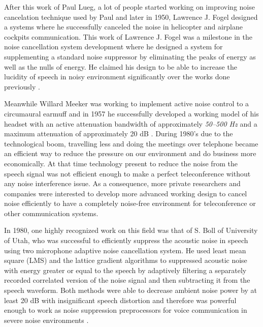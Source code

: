 \documentclass[11pt,a4paper,english]{book}  %
\theoremstyle{definition}  %
\theoremstyle{plain}  %
\theoremstyle{remark}  %
\begin{document}
After this work of Paul Lueg, a lot of people started working on improving noise cancelation technique used by Paul and later in 1950, Lawrence J. Fogel designed a systems where he successfully canceled the noise in helicopter and airplane cockpits communication. This work of Lawrence J. Fogel was a milestone in the noise cancellation system development where he designed a system for supplementing a standard noise suppressor by eliminating the peaks of energy as well as the nulls of energy. He claimed his design to be able to increase the lucidity of speech in noisy environment significantly over the works done previously \cite{patent2}.

Meanwhile Willard Meeker was working to implement active noise control to a circumaural earmuff and in 1957 he successfully developed a working model of his headset with an active attenuation bandwidth of approximately \textit{50–500 Hz} and a maximum attenuation of approximately 20 dB \cite{online3}.
During 1980’s due to the technological boom, travelling less and doing the meetings over telephone became an efficient way to reduce the pressure on our environment and do business more economically. At that time technology present to reduce the noise from the speech signal was not efficient enough to make a perfect teleconference without any noise interference issue. As a consequence, more private researchers and companies were interested to develop more advanced working design to cancel noise efficiently to have a completely noise-free environment for teleconference or other communication systems. 

In 1980, one highly recognized work on this field was that of S. Boll of University of Utah, who was successful to efficiently suppress the acoustic noise in speech using two microphone adaptive noise cancellation system. He used least mean square (LMS) and the lattice gradient algorithms to suppressed acoustic noise with energy greater or equal to the speech by adaptively filtering a separately recorded correlated version of the noise signal and then subtracting it from the speech waveform. Both methods were able to decrease ambient noise power by at least 20 dB with insignificant speech distortion and therefore was powerful enough to work as noise suppression preprocessors for voice communication in severe noise environments \cite{supression}.
\end{document}
